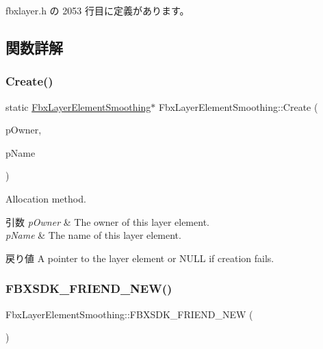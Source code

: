  fbxlayer.\+h の 2053 行目に定義があります。



\subsection{関数詳解}
\mbox{\label{class_fbx_layer_element_smoothing_afdb42053590ce288c60e5539a0b2d875}} 
\subsubsection{\texorpdfstring{Create()}{Create()}}
{\footnotesize\ttfamily static \hyperlink{class_fbx_layer_element_smoothing}{Fbx\+Layer\+Element\+Smoothing}$\ast$ Fbx\+Layer\+Element\+Smoothing\+::\+Create (\begin{DoxyParamCaption}\item[{\hyperlink{class_fbx_layer_container}{Fbx\+Layer\+Container} $\ast$}]{p\+Owner,  }\item[{const char $\ast$}]{p\+Name }\end{DoxyParamCaption})\hspace{0.3cm}{\ttfamily [static]}}

Allocation method. 
\begin{DoxyParams}{引数}
{\em p\+Owner} & The owner of this layer element. \\
\hline
{\em p\+Name} & The name of this layer element. \\
\hline
\end{DoxyParams}
\begin{DoxyReturn}{戻り値}
A pointer to the layer element or {\ttfamily N\+U\+LL} if creation fails. 
\end{DoxyReturn}
\mbox{\label{class_fbx_layer_element_smoothing_aea45577e6b6315795adeaf801538b5ab}} 
\subsubsection{\texorpdfstring{F\+B\+X\+S\+D\+K\+\_\+\+F\+R\+I\+E\+N\+D\+\_\+\+N\+E\+W()}{FBXSDK\_FRIEND\_NEW()}}
{\footnotesize\ttfamily Fbx\+Layer\+Element\+Smoothing\+::\+F\+B\+X\+S\+D\+K\+\_\+\+F\+R\+I\+E\+N\+D\+\_\+\+N\+EW (\begin{DoxyParamCaption}{ }\end{DoxyParamCaption})}

